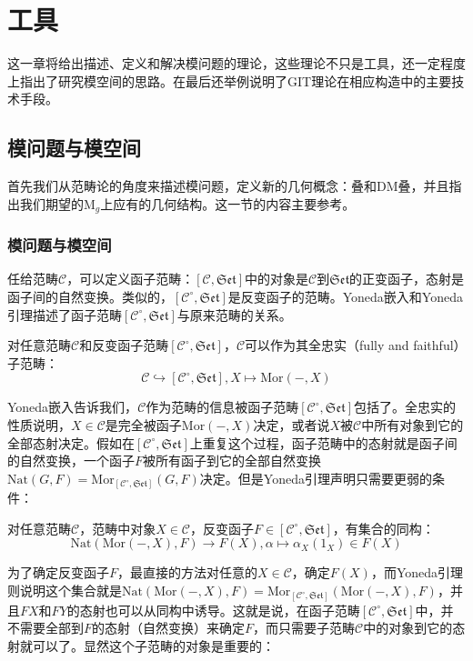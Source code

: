 \chapter{工具}
这一章将给出描述、定义和解决模问题的理论，这些理论不只是工具，还一定程度上指出了研究模空间的思路。在最后还举例说明了GIT理论在相应构造中的主要技术手段。
\section{模问题与模空间}
首先我们从范畴论的角度来描述模问题，定义新的几何概念：叠和DM叠，并且指出我们期望的$ \mathrm{M}_g $上应有的几何结构。这一节的内容主要参考\cite{GIT,DM69,NotesModuliSpaceofCurves}。
\subsection{模问题与模空间}
任给范畴$ \mathscr{C} $，可以定义函子范畴：$ [\mathscr{C},\mathfrak{Set}] $中的对象是$ \mathscr{C} $到$ \mathfrak{Set} $的正变函子，态射是函子间的自然变换。类似的，$ [\mathscr{C}^\circ,\mathfrak{Set} ]$是反变函子的范畴。Yoneda嵌入和Yoneda 引理描述了函子范畴$ [\mathscr{C}^\circ,\mathfrak{Set}] $与原来范畴的关系。
\begin{theorem}
	对任意范畴$ \mathscr{C} $和反变函子范畴$ [\mathscr{C}^\circ,\mathfrak{Set}] $，$ \mathscr{C} $可以作为其全忠实（fully and faithful）子范畴：
	$$ \mathscr{C} \hookrightarrow [\mathscr{C}^\circ,\mathfrak{Set}] , X \mapsto\mathrm{Mor}(-,X) $$
\end{theorem}
Yoneda嵌入告诉我们，$ \mathscr{C} $作为范畴的信息被函子范畴$ [\mathscr{C}^\circ,\mathfrak{Set}] $包括了。全忠实的性质说明，$ X\in\mathscr{C} $是完全被函子$ \mathrm{Mor}(-,X) $决定，或者说$ X $被$ \mathscr{C} $中所有对象到它的全部态射决定。假如在$ [\mathscr{C}^\circ,\mathfrak{Set}]  $上重复这个过程，函子范畴中的态射就是函子间的自然变换，一个函子$ F $被所有函子到它的全部自然变换$ \mathrm{Nat}(G,F)=\mathrm{Mor}_{[\mathscr{C}^\circ,\mathfrak{Set}]}(G,F) $决定。但是Yoneda引理声明只需要更弱的条件：
\begin{theorem}
	对任意范畴$ \mathscr{C} $，范畴中对象$ X\in \mathscr{C}  $，反变函子$ F\in [\mathscr{C}^\circ,\mathfrak{Set}] $，有集合的同构：	
	$$ \mathrm{Nat}(\mathrm{Mor}(-,X),F) \to F(X),\alpha \mapsto \alpha_X(1_X)\in F(X) $$
\end{theorem}
为了确定反变函子$ F $，最直接的方法对任意的$ X\in\mathscr{C} $，确定$ F(X) $，而Yoneda引理则说明这个集合就是$ \mathrm{Nat}(\mathrm{Mor}(-,X),F)=\mathrm{Mor}_{[\mathscr{C}^\circ,\mathfrak{Set}]}(\mathrm{Mor}(-,X),F) $，并且$ FX $和$ FY $的态射也可以从同构中诱导。这就是说，在函子范畴$ [\mathscr{C}^\circ,\mathfrak{Set}] $中，并不需要全部到$ F $的态射（自然变换）来确定$ F $，而只需要子范畴$ \mathscr{C} $中的对象到它的态射就可以了。显然这个子范畴的对象是重要的：
